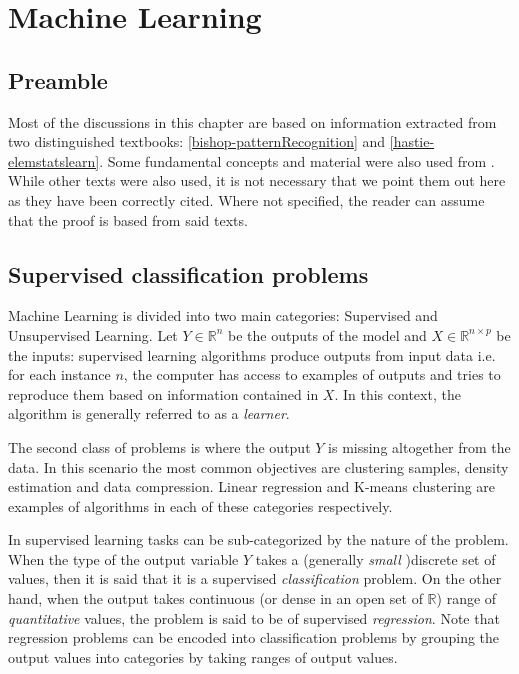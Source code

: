 \chapter{Machine Learning}
\label{cha:machine_learning}


\section{Preamble}\label{section-preamble}
Most of the discussions in this chapter are based on information extracted from two distinguished textbooks: \ref{bishop-patternRecognition} and  \ref{hastie-elemstatslearn}. Some fundamental concepts and material were also used from \label{scikit-learn}. While other texts were also used, it is not necessary that we point them out here as they have been correctly cited. Where not specified, the reader can assume that the proof is based from said texts.

\section{  Supervised classification problems}\label{section-supervised-learning}

Machine Learning is divided into two main categories: Supervised and Unsupervised Learning. Let $Y \in \mathbb{R}^n$ be the outputs of the model and $X \in \mathbb{R}^{n \times  p}$ be the inputs: supervised learning algorithms produce outputs from input data i.e. for each instance $n$, the computer has access to examples of outputs and tries to reproduce them based on information contained in $X$. In this context, the algorithm is generally referred to as a \textit{learner}.

The second class of problems is where the output $Y$ is missing altogether from the data. In this scenario the most common objectives are clustering samples, density estimation and data compression. Linear regression and K-means clustering are examples of algorithms in each of these categories respectively.

In supervised learning tasks can be sub-categorized by the nature of the problem. When the type of the output variable $Y$ takes a (generally \textit{small} )discrete set of values, then it is said that it is a supervised \textit{classification} problem. On the other hand, when the output takes continuous (or dense in an open set of $\mathbb{R}$) range of \textit{quantitative} values, the problem is said to be of supervised \textit{regression}. Note that regression problems can be encoded into classification problems by grouping the output values into categories by taking ranges of output values.

